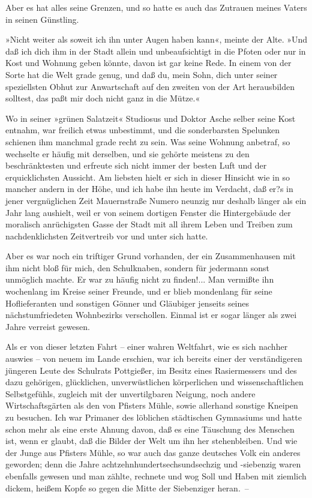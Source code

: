 Aber es hat alles seine Grenzen, und so hatte es auch das Zutrauen
meines Vaters in seinen Günstling.

»Nicht weiter als soweit ich ihn unter Augen haben kann«, meinte
der Alte. »Und daß ich dich ihm in der Stadt allein und
unbeaufsichtigt in die Pfoten oder nur in Kost und Wohnung geben
könnte, davon ist gar keine Rede. In einem von der Sorte hat die
Welt grade genug, und daß du, mein Sohn, dich unter seiner
speziellsten Obhut zur Anwartschaft auf den zweiten von der Art
herausbilden solltest, das paßt mir doch nicht ganz in die Mütze.«

Wo in seiner »grünen Salatzeit« Studiosus und Doktor Asche selber
seine Kost entnahm, war freilich etwas unbestimmt, und die
sonderbarsten Spelunken schienen ihm manchmal grade recht zu sein.
Was seine Wohnung anbetraf, so wechselte er häufig mit derselben,
und sie gehörte meistens zu den beschränktesten und erfreute sich
nicht immer der besten Luft und der erquicklichsten Aussicht. Am
liebsten hielt er sich in dieser Hinsicht wie in so mancher andern
in der Höhe, und ich habe ihn heute im Verdacht, daß er?s in jener
vergnüglichen Zeit Mauernstraße Numero neunzig nur deshalb länger
als ein Jahr lang aushielt, weil er von seinem dortigen Fenster die
Hintergebäude der moralisch anrüchigsten Gasse der Stadt mit all
ihrem Leben und Treiben zum nachdenklichsten Zeitvertreib vor und
unter sich hatte.

Aber es war noch ein triftiger Grund vorhanden, der ein
Zusammenhausen mit ihm nicht bloß für mich, den Schulknaben,
sondern für jedermann sonst unmöglich machte. Er war zu häufig
nicht zu finden!... Man vermißte ihn wochenlang im Kreise seiner
Freunde, und er blieb mondenlang für seine Hoflieferanten und
sonstigen Gönner und Gläubiger jenseits seines nächstumfriedeten
Wohnbezirks verschollen. Einmal ist er sogar länger als zwei Jahre
verreist gewesen.

Als er von dieser letzten Fahrt – einer wahren Weltfahrt, wie es
sich nachher auswies – von neuem im Lande erschien, war ich bereits
einer der verständigeren jüngeren Leute des Schulrats Pottgießer,
im Besitz eines Rasiermessers und des dazu gehörigen, glücklichen,
unverwüstlichen körperlichen und wissenschaftlichen Selbstgefühls,
zugleich mit der unvertilgbaren Neigung, noch andere
Wirtschaftsgärten als den von Pfisters Mühle, sowie allerhand
sonstige Kneipen zu besuchen. Ich war Primaner des löblichen
städtischen Gymnasiums und hatte schon mehr als eine erste Ahnung
davon, daß es eine Täuschung des Menschen ist, wenn er glaubt, daß
die Bilder der Welt um ihn her stehenbleiben. Und wie der Junge aus
Pfisters Mühle, so war auch das ganze deutsches Volk ein anderes
geworden; denn die Jahre achtzehnhundertsechsundsechzig und
-siebenzig waren ebenfalls gewesen und man zählte, rechnete und wog
Soll und Haben mit ziemlich dickem, heißem Kopfe so gegen die Mitte
der Siebenziger heran.~–

